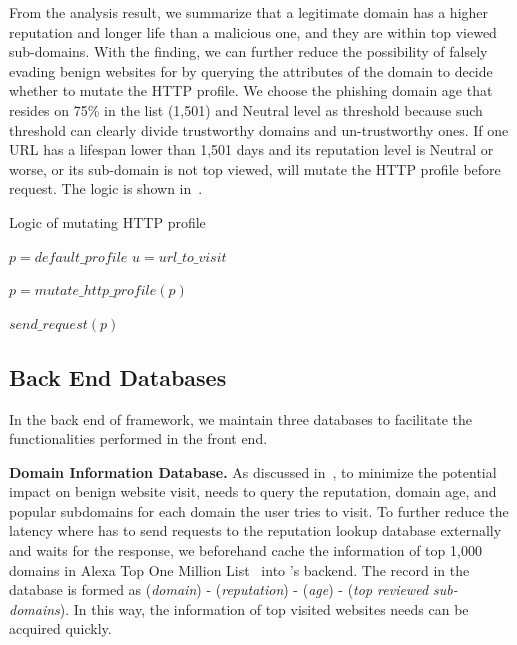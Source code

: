 From the analysis result, we summarize that a legitimate domain has a higher reputation and longer life than a malicious one, and they are within top viewed sub-domains.
With the finding, we can further reduce the possibility of falsely evading benign websites for \spartacus by querying the attributes of the domain to decide whether to mutate the HTTP profile.
We choose the phishing domain age that resides on 75\% in the list (1,501) and Neutral level as threshold because such threshold can clearly divide trustworthy domains and un-trustworthy ones.
If one URL has a lifespan lower than 1,501 days and its reputation level is Neutral or worse, or its sub-domain is not top viewed, \spartacus will mutate the HTTP profile before request.
The logic is shown in~.

\begin{algorithm}
  \caption{Logic of mutating HTTP profile}
\begin{algorithmic}[1]

\State $p = default\_profile$
\State $u = url\_to\_visit$

    \State $p = mutate\_http\_profile(p)$
\EndIf

\State $send\_request(p)$

\end{algorithmic}
\label{alg:mutatelogic}
\end{algorithm}



\subsection{Back End Databases}

In the back end of \spartacus framework, we maintain three databases to facilitate the functionalities performed in the front end.

\noindent
\textbf{Domain Information Database.}
As discussed in~, to minimize the potential impact on benign website visit,
\spartacus needs to query the reputation, domain age, and popular subdomains for each domain the user tries to visit.
To further reduce the latency where \spartacus has to send requests to the reputation lookup database externally and waits for the response,
we beforehand cache the information of top 1,000 domains in Alexa Top One Million List~\cite{AlexaTop1M} into \spartacus's backend.
The record in the database is formed as (\emph{domain}) - (\emph{reputation}) - (\emph{age}) - (\emph{top reviewed sub-domains}).
In this way, the information of top visited websites \spartacus needs can be acquired quickly.


